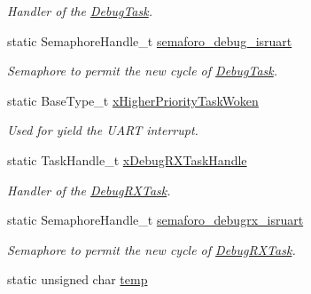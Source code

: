 \begin{DoxyCompactItemize}
\begin{DoxyCompactList}\small\item\em Handler of the \hyperlink{group___debug___exported___functions___group2_ga0e7fca846e34e06a1f62249fe8a30a44}{Debug\+Task}. \end{DoxyCompactList}\item 
static Semaphore\+Handle\+\_\+t \hyperlink{group___debug___private___variables_ga4c5de14a4644bf21d004fd0d61f1fa98}{semaforo\+\_\+debug\+\_\+isruart}\hypertarget{group___debug___private___variables_ga4c5de14a4644bf21d004fd0d61f1fa98}{}\label{group___debug___private___variables_ga4c5de14a4644bf21d004fd0d61f1fa98}

\begin{DoxyCompactList}\small\item\em Semaphore to permit the new cycle of \hyperlink{group___debug___exported___functions___group2_ga0e7fca846e34e06a1f62249fe8a30a44}{Debug\+Task}. \end{DoxyCompactList}\item 
static Base\+Type\+\_\+t \hyperlink{group___debug___private___variables_ga9d9a749ad99ec3d4a6886d5277b9ba87}{x\+Higher\+Priority\+Task\+Woken}\hypertarget{group___debug___private___variables_ga9d9a749ad99ec3d4a6886d5277b9ba87}{}\label{group___debug___private___variables_ga9d9a749ad99ec3d4a6886d5277b9ba87}

\begin{DoxyCompactList}\small\item\em Used for yield the U\+A\+RT interrupt. \end{DoxyCompactList}\item 
static Task\+Handle\+\_\+t \hyperlink{group___debug___private___variables_gaea04f335da7bc1dd47446f89a05d2c6d}{x\+Debug\+R\+X\+Task\+Handle}\hypertarget{group___debug___private___variables_gaea04f335da7bc1dd47446f89a05d2c6d}{}\label{group___debug___private___variables_gaea04f335da7bc1dd47446f89a05d2c6d}

\begin{DoxyCompactList}\small\item\em Handler of the \hyperlink{group___debug___exported___functions___group2_ga8013ff117a9e96e630d30771cf9b0199}{Debug\+R\+X\+Task}. \end{DoxyCompactList}\item 
static Semaphore\+Handle\+\_\+t \hyperlink{group___debug___private___variables_gaeefc3248920a99b9436147de4aeff800}{semaforo\+\_\+debugrx\+\_\+isruart}\hypertarget{group___debug___private___variables_gaeefc3248920a99b9436147de4aeff800}{}\label{group___debug___private___variables_gaeefc3248920a99b9436147de4aeff800}

\begin{DoxyCompactList}\small\item\em Semaphore to permit the new cycle of \hyperlink{group___debug___exported___functions___group2_ga8013ff117a9e96e630d30771cf9b0199}{Debug\+R\+X\+Task}. \end{DoxyCompactList}\item 
static unsigned char \hyperlink{group___debug___private___variables_gabe413cb96d839cbe31417aa52d920f21}{temp}
\end{DoxyCompactItemize}


